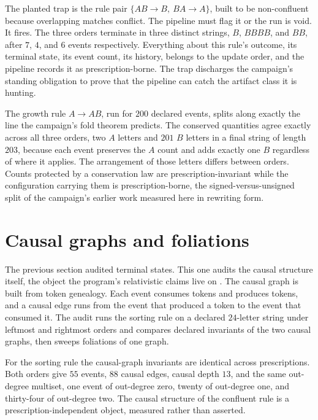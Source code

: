 \documentclass[aps,pre,reprint,nofootinbib]{revtex4-2}
\begin{document}
The planted trap is the rule pair $\{AB \to B,\ BA \to A\}$, built to
be non-confluent because overlapping matches conflict.  The pipeline
must flag it or the run is void.  It fires.  The three orders
terminate in three distinct strings, $B$, $BBBB$, and $BB$, after $7$,
$4$, and $6$ events respectively.  Everything about this rule's
outcome, its terminal state, its event count, its history, belongs to
the update order, and the pipeline records it as prescription-borne.
The trap discharges the campaign's standing obligation to prove that
the pipeline can catch the artifact class it is hunting.

The growth rule $A \to AB$, run for $200$ declared events, splits
along exactly the line the campaign's fold theorem predicts.  The
conserved quantities agree exactly across all three orders, two $A$
letters and $201$ $B$ letters in a final string of length $203$,
because each event preserves the $A$ count and adds exactly one $B$
regardless of where it applies.  The arrangement of those letters
differs between orders.  Counts protected by a conservation law are
prescription-invariant while the configuration carrying them is
prescription-borne, the signed-versus-unsigned split of the campaign's
earlier work measured here in rewriting form.

\section{Causal graphs and foliations}
\label{sec:wm3}

The previous section audited terminal states.  This one audits the
causal structure itself, the object the program's relativistic claims
live on \cite{Gorard2020a}.  The causal graph is built from token
genealogy.  Each event consumes tokens and produces tokens, and a
causal edge runs from the event that produced a token to the event
that consumed it.  The audit runs the sorting rule on a declared
$24$-letter string under leftmost and rightmost orders and compares
declared invariants of the two causal graphs, then sweeps foliations
of one graph.

For the sorting rule the causal-graph invariants are identical across
prescriptions.  Both orders give $55$ events, $88$ causal edges,
causal depth $13$, and the same out-degree multiset, one event of
out-degree zero, twenty of out-degree one, and thirty-four of
out-degree two.  The causal structure of the confluent rule is a
prescription-independent object, measured rather than asserted.
\end{document}
